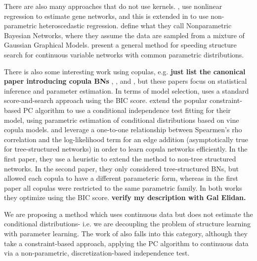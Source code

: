 \documentclass{article} %
\begin{document}
There are also many approaches that do not use kernels.  \cite{imoto2001estimation}, use nonlinear regression to estimate gene networks, and this is extended in \cite{imoto2003bayesian} to use non-parametric heteroscedastic regression.  \cite{ickstadt2010nonparametric} define what they call Nonparametric Bayesian Networks, where they assume the data are sampled from a mixture of Gaussian Graphical Models. \cite{elidan2007ideal} present a general method for speeding structure search for continuous variable networks with common parametric distributions. 

There is also some interesting work using copulas, e.g. {\bf just list the canonical paper introducing copula BNs}  \cite{hanea2006hybrid}, \cite{hanea2008mixed}, and \cite{hanea2010mining}, but these papers focus on statistical inference and parameter estimation.  In terms of model selection, \cite{elidan2010copula} uses a standard score-and-search approach using the BIC score.  \cite{bauer2012pair} extend the popular constraint-based PC algorithm to use a conditional independence test fitting for their model, using parametric estimation of conditional distributions based on vine copula models.  \cite{elidan2012lightning} and \cite{tenzer2013speedy} leverage a one-to-one relationship between Spearmen's rho correlation and the log-likelihood term for an edge addition (asymptotically true for tree-structured networks) in order to learn copula networks efficiently.  In the first paper, they use a heuristic to extend the method to non-tree structured networks.  In the second paper, they only considered tree-structured BNs, but allowed each copula to have a different parameteric form, whereas in the first paper all copulas were restricted to the same parametric family.  In both works they optimize using the BIC score. {\bf verify my description with Gal Elidan.}

We are proposing a method which uses continuous data but does not estimate the conditional distributions- i.e. we are decoupling the problem of structure learning with parameter learning.  The work of \cite{margaritis2005distribution} also falls into this category, although they take a constraint-based approach, applying the PC algorithm to continuous data via a non-parametric, discretization-based independence test.
\end{document}
